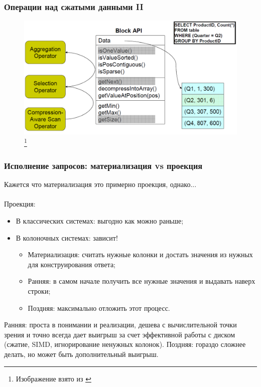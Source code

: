 \documentclass{beamer}
\begin{document}
\begin{frame}
\frametitle{Операции над сжатыми данными II}

\begin{figure}[htb]
\includegraphics[width=\textwidth,height=0.75\textheight,keepaspectratio]{compression9.png} 
\footnote{\tiny{Изображение взято из \cite{Harizopoulos2009}}}
 \end{figure}    

\end{frame}


\begin{frame}
\frametitle{Исполнение запросов: материализация vs проекция}

Кажется что материализация это примерно проекция, однако...\\~\\

Проекция:
\begin{itemize}
  \setlength\itemsep{1em}
  \item В классических системах: выгодно как можно раньше;
  \item В колоночных системах: зависит!
  \begin{itemize}
    \item Материализация: считать нужные колонки и достать значения из нужных для конструирования ответа;
    \item Ранняя: в самом начале получить все нужные значения и выдавать наверх строки;
    \item Поздняя: максимально отложить этот процесс.
  \end{itemize}
\end{itemize}

Ранняя: проста в понимании и реализации, дешева с вычислительной точки зрения и точно \alert{всегда} дает выигрыш за счет эффективной работы с диском (сжатие, SIMD, игнорирование ненужных колонок). Поздняя: гораздо сложнее делать, но может быть \alert{дополнительный} выигрыш.

\end{frame}
\end{document}
